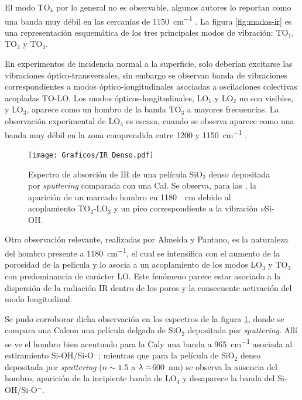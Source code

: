 		 El modo TO$_4$ por lo general no es observable, algunos autores lo reportan como una banda muy débil en las cercanías de \SI{1150}{\cm^{-1}} \cite{Pai1986,Grosse1986}. La figura \ref{fig:modos-ir} es una representación esquemática de los tres principales modos de vibración: TO$_1$, TO$_2$ y TO$_3$.

		 En experimentos de incidencia normal a la superficie, solo deberían excitarse las vibraciones óptico-transversales, sin embargo se observan banda de vibraciones correspondientes a modos óptico-longitudinales asociadas a oscilaciones colectivas acopladas TO-LO\cite{Pai1986,Grosse1986,Innocenzi2003}. Los modos ópticos-longitudinales, LO$_1$ y LO$_2$ no son visibles, y LO$_3$, aparece como un hombro de la banda TO$_3$ a mayores frecuencias. La observación experimental de LO$_4$ es escasa, cuando se observa aparece como una banda muy débil en la zona comprendida entre 1200 y \SI{1150}{\cm^{-1}} \cite{Pai1986,Grosse1986}.
		 
		  \begin{figure}[!th]
						\begin{center}
						\texttt{[image: Graficos/IR\_Denso.pdf]}
						\caption[FTIR SiO$_2$ denso y SiO$_2$ mesoporoso.]{Espectro de absorción de IR de una película SiO$_2$ denso depositada por \textit{sputtering }comparada con una Cal\pdmF. Se observa, para las \pdm, la aparición de un marcado hombro en \SI{1180}{\per\cm} debido al acoplamiento TO$_3$-LO$_3$ y un pico correspondiente a la vibración $\nu$Si-OH.}
						\label{fig:IR-denso}
						\end{center}
						\end{figure}

		 \pagebreak Otra observación relevante, realizadas por Almeida y Pantano\cite{Almeida1990}, es la naturaleza del hombro presente a \SI{1180}{\cm^{-1}}, el cual se intensifica con el aumento de la porosidad de la película y lo asocia a un acoplamiento de los modos LO$_3$ y TO$_3$ con predominancia de carácter LO. Este fenómeno parece estar asociado a la dispersión de la radiación IR dentro de los poros y la consecuente activación del modo longitudinal.	
			
		 Se pudo corroborar dicha observación en los espectros de la figura \ref{fig:IR-denso}, donde se compara una Cal\pdm\space con una película delgada de SiO$_2$ depositada por \textit{sputtering}. Allí se ve el hombro bien acentuado para la Cal\pdmF\space y una banda a \SI{965}{\cm^{-1}} asociada al estiramiento Si-OH/Si-O$^-$; mientras que para la película de SiO$_2$ denso depositada por \textit{sputtering} ($n\sim 1.5$ a $\lambda\index{longitud de onda}=$\SI{600}{\nm})\cite{Vergohl1999} se observa la ausencia del hombro, aparición de la incipiente banda de LO$_4$ y desaparece la banda del Si-OH/Si-O$^-$.

